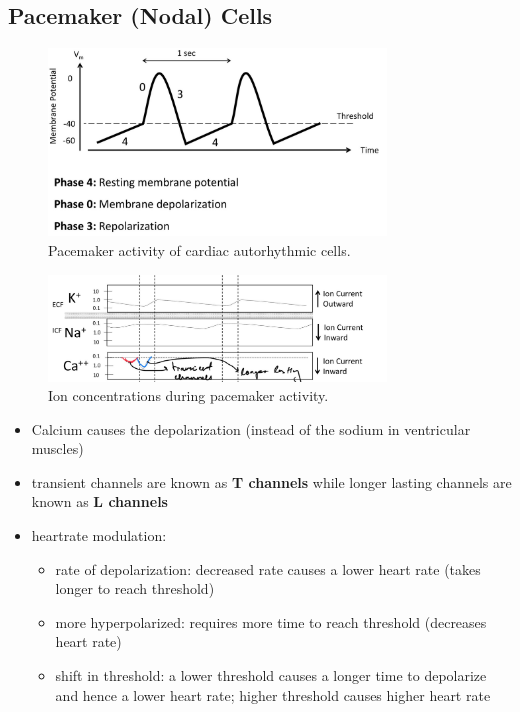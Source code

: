 \documentclass[10pt]{article}
\begin{document}
\subsection{Pacemaker (Nodal) Cells}
\begin{figure}[h]
    \centering
    \includegraphics[width=0.8\textwidth]{pacemakerActionPotential.jpeg}
    \caption{Pacemaker activity of cardiac autorhythmic cells.}
    \label{fig:pacemakerActionPotential.jpeg}
\end{figure}
\begin{figure}[h]
    \centering
    \includegraphics[width=0.8\textwidth]{pacemakerIonConcentration.jpeg}
    \caption{Ion concentrations during pacemaker activity.}
    \label{fig:pacemakerIonConcentration.jpeg}
\end{figure}
\begin{itemize}
    \item Calcium causes the depolarization (instead of the sodium in ventricular muscles)
    \item transient channels are known as \textbf{T channels} while longer lasting channels are known as \textbf{L channels} 
    \item heartrate modulation:
        \begin{itemize}
            \item rate of depolarization: decreased rate causes a lower heart rate (takes longer to reach threshold) 
            \item more hyperpolarized: requires more time to reach threshold (decreases heart rate)
            \item shift in threshold: a lower threshold causes a longer time to depolarize and hence a lower heart rate; higher threshold causes higher heart rate
        \end{itemize}
\end{itemize}
\end{document}
